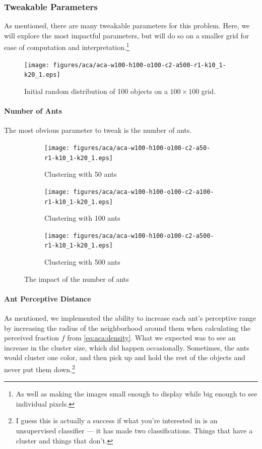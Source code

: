\documentclass[12pt]{article}
\begin{document}
\subsubsection{Tweakable Parameters}
As mentioned, there are many tweakable parameters for this problem. Here, we will explore the most impactful parameters, but will do so on a smaller grid for ease of computation and interpretation.\footnote{As well as making the images small enough to display while big enough to see individual pixels.}

\begin{figure}[H]
    \centering
    \texttt{[image: figures/aca/aca-w100-h100-o100-c2-a500-r1-k10\_1-k20\_1.eps]}
    \caption{Initial random distribution of 100 objects on a $100 \times 100$ grid.}\label{fig:aca:rand-objects}
\end{figure}

\paragraph{Number of Ants} The most obvious parameter to tweak is the number of ants.

\begin{figure}[H]
    \begin{subfigure}[b]{0.32\textwidth}
        \centering
        \texttt{[image: figures/aca/aca-w100-h100-o100-c2-a50-r1-k10\_1-k20\_1.eps]}
        \caption{Clustering with 50 ants}\label{fig:aca:num-ants-50}
    \end{subfigure}
    \begin{subfigure}[b]{0.32\textwidth}
        \centering
        \texttt{[image: figures/aca/aca-w100-h100-o100-c2-a100-r1-k10\_1-k20\_1.eps]}
        \caption{Clustering with 100 ants}\label{fig:aca:num-ants-100}
    \end{subfigure}
    \begin{subfigure}[b]{0.32\textwidth}
        \centering
        \texttt{[image: figures/aca/aca-w100-h100-o100-c2-a500-r1-k10\_1-k20\_1.eps]}
        \caption{Clustering with 500 ants}\label{fig:aca:num-ants-200}
    \end{subfigure}
    \caption{The impact of the number of ants}\label{fig:aca:num-ants}
\end{figure}

\paragraph{Ant Perceptive Distance} As mentioned, we implemented the ability to increase each ant's perceptive range by increasing the radius of the neighborhood around them when calculating the perceived fraction $f$ from \autoref{eq:aca:density}.
What we expected was to see an increase in the cluster size, which did happen occasionally.
Sometimes, the ants would cluster one color, and then pick up and hold the rest of the objects and never put them down.\footnote{I guess this is actually a success if what you're interested in is an unsupervised classifier --- it has made two classifications. Things that have a cluster and things that don't.}
\end{document}
